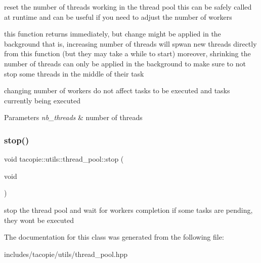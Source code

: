 reset the number of threads working in the thread pool this can be safely called at runtime and can be useful if you need to adjust the number of workers

this function returns immediately, but change might be applied in the background that is, increasing number of threads will spwan new threads directly from this function (but they may take a while to start) moreover, shrinking the number of threads can only be applied in the background to make sure to not stop some threads in the middle of their task

changing number of workers do not affect tasks to be executed and tasks currently being executed


\begin{DoxyParams}{Parameters}
{\em nb\+\_\+threads} & number of threads \\
\hline
\end{DoxyParams}
\mbox{\label{classtacopie_1_1utils_1_1thread__pool_a8874d7040d12fbe446519bc9f2bcff37}} 
\subsubsection{\texorpdfstring{stop()}{stop()}}
{\footnotesize\ttfamily void tacopie\+::utils\+::thread\+\_\+pool\+::stop (\begin{DoxyParamCaption}\item[{void}]{ }\end{DoxyParamCaption})}

stop the thread pool and wait for workers completion if some tasks are pending, they won\textquotesingle{}t be executed 

The documentation for this class was generated from the following file\+:\begin{DoxyCompactItemize}
\item 
includes/tacopie/utils/thread\+\_\+pool.\+hpp\end{DoxyCompactItemize}
